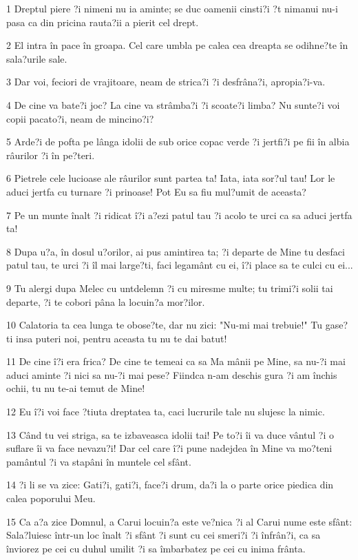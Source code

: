 \par 1 Dreptul piere ?i nimeni nu ia aminte; se duc oamenii cinsti?i ?t nimanui nu-i pasa ca din pricina rauta?ii a pierit cel drept.
\par 2 El intra în pace în groapa. Cel care umbla pe calea cea dreapta se odihne?te în sala?urile sale.
\par 3 Dar voi, feciori de vrajitoare, neam de strica?i ?i desfrâna?i, apropia?i-va.
\par 4 De cine va bate?i joc? La cine va strâmba?i ?i scoate?i limba? Nu sunte?i voi copii pacato?i, neam de mincino?i?
\par 5 Arde?i de pofta pe lânga idolii de sub orice copac verde ?i jertfi?i pe fii în albia râurilor ?i în pe?teri.
\par 6 Pietrele cele lucioase ale râurilor sunt partea ta! Iata, iata sor?ul tau! Lor le aduci jertfa cu turnare ?i prinoase! Pot Eu sa fiu mul?umit de aceasta?
\par 7 Pe un munte înalt ?i ridicat î?i a?ezi patul tau ?i acolo te urci ca sa aduci jertfa ta!
\par 8 Dupa u?a, în dosul u?orilor, ai pus amintirea ta; ?i departe de Mine tu desfaci patul tau, te urci ?i îl mai large?ti, faci legamânt cu ei, î?i place sa te culci cu ei...
\par 9 Tu alergi dupa Melec cu untdelemn ?i cu miresme multe; tu trimi?i solii tai departe, ?i te cobori pâna la locuin?a mor?ilor.
\par 10 Calatoria ta cea lunga te obose?te, dar nu zici: "Nu-mi mai trebuie!" Tu gase?ti insa puteri noi, pentru aceasta tu nu te dai batut!
\par 11 De cine î?i era frica? De cine te temeai ca sa Ma mânii pe Mine, sa nu-?i mai aduci aminte ?i nici sa nu-?i mai pese? Fiindca n-am deschis gura ?i am închis ochii, tu nu te-ai temut de Mine!
\par 12 Eu î?i voi face ?tiuta dreptatea ta, caci lucrurile tale nu slujesc la nimic.
\par 13 Când tu vei striga, sa te izbaveasca idolii tai! Pe to?i îi va duce vântul ?i o suflare îi va face nevazu?i! Dar cel care î?i pune nadejdea în Mine va mo?teni pamântul ?i va stapâni în muntele cel sfânt.
\par 14 ?i li se va zice: Gati?i, gati?i, face?i drum, da?i la o parte orice piedica din calea poporului Meu.
\par 15 Ca a?a zice Domnul, a Carui locuin?a este ve?nica ?i al Carui nume este sfânt: Sala?luiesc într-un loc înalt ?i sfânt ?i sunt cu cei smeri?i ?i înfrân?i, ca sa înviorez pe cei cu duhul umilit ?i sa îmbarbatez pe cei cu inima frânta.
